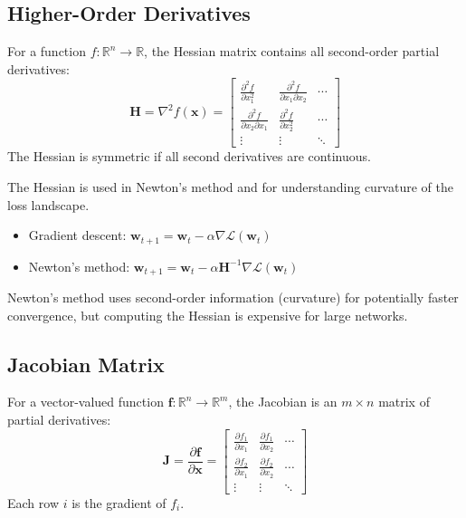 \subsection{Higher-Order Derivatives}

\begin{definition}
For a function $f: \mathbb{R}^n \to \mathbb{R}$, the Hessian matrix contains all second-order partial derivatives:
\begin{equation}
\mathbf{H} = \nabla^2 f(\mathbf{x}) = \begin{bmatrix}
\frac{\partial^2 f}{\partial x_1^2} & \frac{\partial^2 f}{\partial x_1 \partial x_2} & \cdots \\
\frac{\partial^2 f}{\partial x_2 \partial x_1} & \frac{\partial^2 f}{\partial x_2^2} & \cdots \\
\vdots & \vdots & \ddots
\end{bmatrix}
\end{equation}
The Hessian is symmetric if all second derivatives are continuous.
\end{definition}

The Hessian is used in Newton's method and for understanding curvature of the loss landscape.

\begin{example}
\begin{itemize}
    \item Gradient descent: $\mathbf{w}_{t+1} = \mathbf{w}_t - \alpha \nabla \mathcal{L}(\mathbf{w}_t)$
    \item Newton's method: $\mathbf{w}_{t+1} = \mathbf{w}_t - \alpha \mathbf{H}^{-1} \nabla \mathcal{L}(\mathbf{w}_t)$
\end{itemize}
Newton's method uses second-order information (curvature) for potentially faster convergence, but computing the Hessian is expensive for large networks.
\end{example}

\subsection{Jacobian Matrix}

\begin{definition}[Jacobian]
For a vector-valued function $\mathbf{f}: \mathbb{R}^n \to \mathbb{R}^m$, the Jacobian is an $m \times n$ matrix of partial derivatives:
\begin{equation}
\mathbf{J} = \frac{\partial \mathbf{f}}{\partial \mathbf{x}} = \begin{bmatrix}
\frac{\partial f_1}{\partial x_1} & \frac{\partial f_1}{\partial x_2} & \cdots \\
\frac{\partial f_2}{\partial x_1} & \frac{\partial f_2}{\partial x_2} & \cdots \\
\vdots & \vdots & \ddots
\end{bmatrix}
\end{equation}
Each row $i$ is the gradient of $f_i$.
\end{definition}

